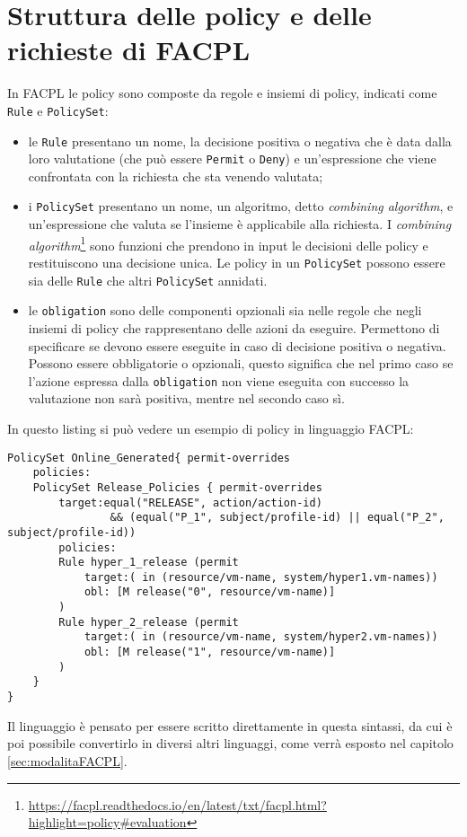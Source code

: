 \section{Struttura delle policy e delle richieste di FACPL}
In FACPL le policy sono composte da regole e insiemi di policy, indicati come \texttt{Rule} e \texttt{PolicySet}:
\begin{itemize}
    \item le \texttt{Rule} presentano un nome, la decisione positiva o negativa che è data dalla loro valutatione (che può essere \texttt{Permit} o \texttt{Deny}) e un'espressione che viene confrontata con la richiesta che sta venendo valutata;
    \item i \texttt{PolicySet} presentano un nome, un algoritmo, detto \emph{combining algorithm}, e un'espressione che valuta se l'insieme è applicabile alla richiesta. I \emph{combining algorithm}\footnote{\url{https://facpl.readthedocs.io/en/latest/txt/facpl.html?highlight=policy\#evaluation}} sono funzioni che prendono in input le decisioni delle policy e restituiscono una decisione unica. Le policy in un \texttt{PolicySet} possono essere sia delle \texttt{Rule} che altri \texttt{PolicySet} annidati.
    \item le \texttt{obligation} sono delle componenti opzionali sia nelle regole che negli insiemi di policy che rappresentano delle azioni da eseguire. Permettono di specificare se devono essere eseguite in caso di decisione positiva o negativa. Possono essere obbligatorie o opzionali, questo significa che nel primo caso se l'azione espressa dalla \texttt{obligation} non viene eseguita con successo la valutazione non sarà positiva, mentre nel secondo caso sì.
\end{itemize}
In questo listing si può vedere un esempio di policy in linguaggio FACPL:
\begin{lstlisting}[label={code:policyFACPL}, caption={Esempio di policy in FACPL}, language=FACPL, basicstyle=\fontsize{9.5}{10}\ttfamily]
PolicySet Online_Generated{ permit-overrides
	policies:
	PolicySet Release_Policies { permit-overrides
  		target:equal("RELEASE", action/action-id)
    			&& (equal("P_1", subject/profile-id) || equal("P_2", subject/profile-id))
  		policies:
    	Rule hyper_1_release (permit
      		target:( in (resource/vm-name, system/hyper1.vm-names))
      		obl: [M release("0", resource/vm-name)]
    	)
    	Rule hyper_2_release (permit
      		target:( in (resource/vm-name, system/hyper2.vm-names))
      		obl: [M release("1", resource/vm-name)]
    	)
  	}
}
\end{lstlisting}
Il linguaggio è pensato per essere scritto direttamente in questa sintassi, da cui è poi possibile convertirlo in diversi altri linguaggi, come verrà esposto nel capitolo \ref{sec:modalitaFACPL}.\par

